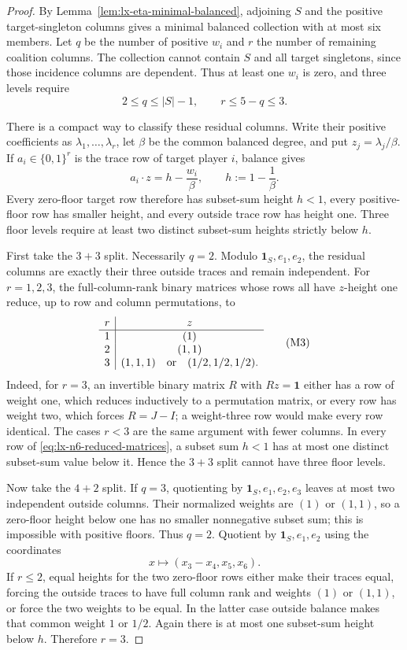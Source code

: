 \begin{proof}
By Lemma~\ref{lem:lx-eta-minimal-balanced}, adjoining $S$ and the positive
target-singleton columns gives a minimal balanced collection with at most six
members.  Let $q$ be the number of positive $w_i$ and $r$ the number of
remaining coalition columns.  The collection cannot contain $S$ and all
target singletons, since those incidence columns are dependent.  Thus at
least one $w_i$ is zero, and three levels require
\[
 2\leq q\leq |S|-1,
 \qquad r\leq5-q\leq3.                         \tag{R}
\]

There is a compact way to classify these residual columns.  Write their
positive coefficients as $\lambda_1,\ldots,\lambda_r$, let $\beta$ be the
common balanced degree, and put $z_j=\lambda_j/\beta$.  If
$a_i\in\{0,1\}^r$ is the trace row of target player $i$, balance gives
\[
 a_i\mathbin{\cdot}z=h-\frac{w_i}{\beta},
 \qquad h:=1-\frac1\beta.                       \tag{H}
 \label{eq:lx-n6-subset-height}
\]
Every zero-floor target row therefore has subset-sum height $h<1$, every
positive-floor row has smaller height, and every outside trace row has height
one.  Three floor levels require at least two distinct subset-sum heights
strictly below $h$.

First take the $3+3$ split.  Necessarily $q=2$.  Modulo
$\mathbf1_S,e_1,e_2$, the residual columns are exactly their three outside
traces and remain independent.  For $r=1,2,3$, the full-column-rank binary
matrices whose rows all have $z$-height one reduce, up to row and column
permutations, to
\[
 \begin{array}{c|c}
 r&z\\ \hline
 1&(1)\\
 2&(1,1)\\
 3&(1,1,1)\quad\hbox{or}\quad(1/2,1/2,1/2).
 \end{array}                                      \tag{M3}
 \label{eq:lx-n6-reduced-matrices}
\]
Indeed, for $r=3$, an invertible binary matrix $R$ with
$Rz=\mathbf1$ either has a row of weight one, which reduces inductively to a
permutation matrix, or every row has weight two, which forces
$R=J-I$; a weight-three row would make every row identical.  The cases
$r<3$ are the same argument with fewer columns.  In every row of
\eqref{eq:lx-n6-reduced-matrices}, a subset sum $h<1$ has at most one distinct subset-sum value below
it.  Hence the $3+3$ split cannot have three floor levels.

Now take the $4+2$ split.  If $q=3$, quotienting by
$\mathbf1_S,e_1,e_2,e_3$ leaves at most two independent outside columns.
Their normalized weights are $(1)$ or $(1,1)$, so a zero-floor height below
one has no smaller nonnegative subset sum; this is impossible with positive
floors.  Thus $q=2$.  Quotient by $\mathbf1_S,e_1,e_2$ using the coordinates
\[
 x\longmapsto(x_3-x_4,x_5,x_6).                  \tag{Q}
 \label{eq:lx-n6-quotient-map}
\]
If $r\leq2$, equal heights for the two zero-floor rows either make their
traces equal, forcing the outside traces to have full column rank and weights
$(1)$ or $(1,1)$, or force the two weights to be equal.  In the latter case
outside balance makes that common weight $1$ or $1/2$.  Again there is at
most one subset-sum height below $h$.  Therefore $r=3$.


\end{proof}
